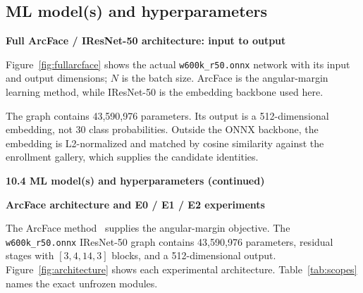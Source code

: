 \documentclass[11pt,a4paper]{article}
\newcommand{\code}[1]{\texttt{#1}}
\newcommand{\cont}[1]{\par{\sffamily\bfseries #1}\par}
\newcommand{\nextpage}{\clearpage}
\begin{document}
\subsection{ML model(s) and hyperparameters}
\cont{Full ArcFace / IResNet-50 architecture: input to output}
Figure~\ref{fig:fullarcface} shows the actual \code{w600k\_r50.onnx} network with its input and output dimensions; $N$ is the batch size. ArcFace is the angular-margin learning method, while IResNet-50 is the embedding backbone used here.
\begin{center}
\label{fig:fullarcface}
\end{center}
The graph contains 43,590,976 parameters. Its output is a 512-dimensional embedding, not 30 class probabilities. Outside the ONNX backbone, the embedding is L2-normalized and matched by cosine similarity against the enrollment gallery, which supplies the candidate identities.
\nextpage
\cont{10.4 ML model(s) and hyperparameters (continued)}
\cont{ArcFace architecture and E0 / E1 / E2 experiments}
The ArcFace method~\cite{arcface} supplies the angular-margin objective. The \code{w600k\_r50.onnx} IResNet-50 graph contains 43,590,976 parameters, residual stages with $[3,4,14,3]$ blocks, and a 512-dimensional output. Figure~\ref{fig:architecture} shows each experimental architecture. Table~\ref{tab:scopes} names the exact unfrozen modules.
\end{document}
